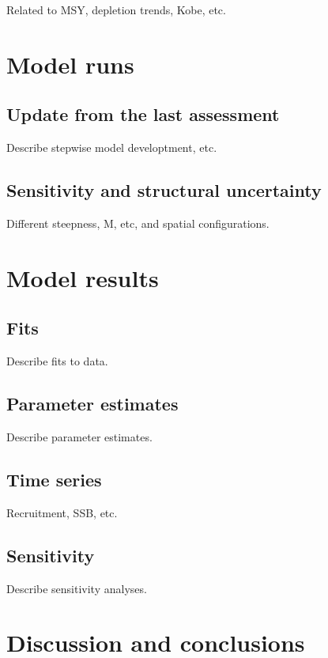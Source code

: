 \documentclass[
]{scrartcl}
\begin{document}
Related to MSY, depletion trends, Kobe, etc.

\section{Model runs}\label{model-runs}

\subsection{Update from the last
assessment}\label{update-from-the-last-assessment}

Describe stepwise model developtment, etc.

\subsection{Sensitivity and structural
uncertainty}\label{sensitivity-and-structural-uncertainty}

Different steepness, M, etc, and spatial configurations.

\section{Model results}\label{model-results}

\subsection{Fits}\label{fits}

Describe fits to data.

\subsection{Parameter estimates}\label{parameter-estimates}

Describe parameter estimates.

\subsection{Time series}\label{time-series}

Recruitment, SSB, etc.

\subsection{Sensitivity}\label{sensitivity}

Describe sensitivity analyses.

\section{Discussion and conclusions}\label{discussion-and-conclusions}
\end{document}
